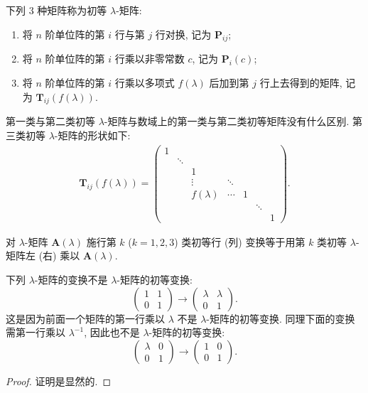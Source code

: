 \documentclass[../../main.tex]{subfiles}%
\begin{document}
\begin{definition}[初等$\lambda$-矩阵]
下列 3 种矩阵称为初等 $\lambda$-矩阵:
\begin{enumerate}[(1)]
\item 将 $n$ 阶单位阵的第 $i$ 行与第 $j$ 行对换, 记为 $\boldsymbol{P}_{ij}$;

\item 将 $n$ 阶单位阵的第 $i$ 行乘以非零常数 $c$, 记为 $\boldsymbol{P}_{i}(c)$;

\item 将 $n$ 阶单位阵的第 $i$ 行乘以多项式 $f(\lambda)$ 后加到第 $j$ 行上去得到的矩阵, 记为 $\boldsymbol{T}_{ij}(f(\lambda))$.
\end{enumerate}
\end{definition}
\begin{remark}
第一类与第二类初等 $\lambda$-矩阵与数域上的第一类与第二类初等矩阵没有什么区别. 第三类初等 $\lambda$-矩阵的形状如下:
\begin{align*}
\boldsymbol{T}_{ij}(f(\lambda))=
\begin{pmatrix}
1 & & & & & \\
& \ddots & & & & \\
& & 1 & & & \\
& & \vdots & \ddots & & \\
& & f(\lambda) & \cdots & 1 & \\
& & & & & \ddots & \\
& & & & & & 1
\end{pmatrix}.
\end{align*} 
\end{remark}

\begin{theorem}
对 $\lambda$-矩阵 $\boldsymbol{A}(\lambda)$ 施行第 $k$ ($k = 1,2,3$) 类初等行 (列) 变换等于用第 $k$ 类初等 $\lambda$-矩阵左 (右) 乘以 $\boldsymbol{A}(\lambda)$. 
\end{theorem}
\begin{remark}
下列 $\lambda$-矩阵的变换不是 $\lambda$-矩阵的初等变换:
\[
\begin{pmatrix}
1 & 1 \\
0 & 1
\end{pmatrix}
\rightarrow
\begin{pmatrix}
\lambda & \lambda \\
0 & 1
\end{pmatrix}.
\]
这是因为前面一个矩阵的第一行乘以 $\lambda$ 不是 $\lambda$-矩阵的初等变换. 同理下面的变换需第一行乘以 $\lambda^{-1}$, 因此也不是 $\lambda$-矩阵的初等变换:
\[
\begin{pmatrix}
\lambda & 0 \\
0 & 1
\end{pmatrix}
\rightarrow
\begin{pmatrix}
1 & 0 \\
0 & 1
\end{pmatrix}.
\] 
\end{remark}
\begin{proof}

证明是显然的.

\end{proof}
\end{document}
